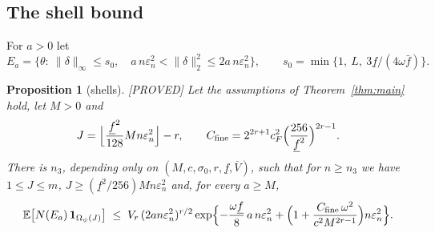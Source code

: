 \documentclass[11pt]{article}
\newtheorem{proposition}{Proposition}
\theoremstyle{definition}
\theoremstyle{remark}
\newcommand{\E}{\mathbb{E}}
\newcommand{\om}{\omega}
\newcommand{\en}{\varepsilon_n}
\newcommand{\fl}{\underline f}
\newcommand{\fu}{\bar f}
\newcommand{\Vb}{\bar V}
\newcommand{\ind}{\mathbf 1}
\newcommand{\proved}{\textup{[PROVED]}}
\begin{document}
\subsection{The shell bound}

For $a>0$ let
\[
E_a=\bigl\{\theta:\ \|\delta\|_\infty\le s_0,\quad a\,n\en^2<\|\delta\|_2^2\le2a\,n\en^2\bigr\},\qquad s_0=\min\{1,\ L,\ 3\fl/(4\om\fu)\}.
\]

\begin{proposition}[shells]\label{prop:shell}\proved{}
Let the assumptions of Theorem~\ref{thm:main} hold, let $M>0$ and
\[
J=\Bigl\lfloor\frac{\fl^2}{128}Mn\en^2\Bigr\rfloor-r,\qquad C_{\rm fine}=2^{2r+1}c_F^2\Bigl(\frac{256}{\fl^2}\Bigr)^{2r-1}.
\]
There is $n_3$, depending only on $(M,c,\sigma_0,r,\fl,\Vb)$, such that for $n\ge n_3$ we have $1\le J\le m$, $J\ge(\fl^2/256)Mn\en^2$ and, for every $a\ge M$,
\[
\E\bigl[N(E_a)\,\ind_{\Omega_\psi(J)}\bigr]\;\le\;V_r\,(2an\en^2)^{r/2}\exp\Bigl\{-\frac{\om\fl}{8}\,a\,n\en^2+\Bigl(1+\frac{C_{\rm fine}\,\om^2}{c^2M^{2r-1}}\Bigr)n\en^2\Bigr\}.
\]
\end{proposition}
\end{document}
